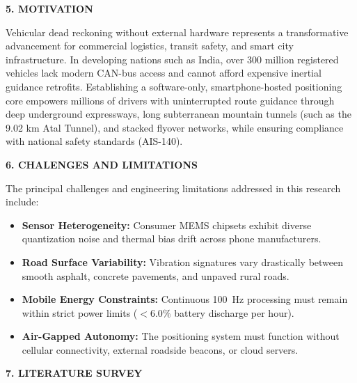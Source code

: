 \documentclass[11pt,a4paper]{article}
\begin{document}
\vspace{0.15cm}
\begin{center}
{\large \textbf{5. MOTIVATION}}
\end{center}
Vehicular dead reckoning without external hardware represents a transformative advancement for commercial logistics, transit safety, and smart city infrastructure. In developing nations such as India, over 300 million registered vehicles lack modern CAN-bus access and cannot afford expensive inertial guidance retrofits. Establishing a software-only, smartphone-hosted positioning core empowers millions of drivers with uninterrupted route guidance through deep underground expressways, long subterranean mountain tunnels (such as the 9.02 km Atal Tunnel), and stacked flyover networks, while ensuring compliance with national safety standards (AIS-140).

\vspace{0.15cm}
\begin{center}
{\large \textbf{6. CHALENGES AND LIMITATIONS}}
\end{center}
The principal challenges and engineering limitations addressed in this research include:
\begin{itemize}[leftmargin=0.7cm,itemsep=1.0pt]
\item \textbf{Sensor Heterogeneity:} Consumer MEMS chipsets exhibit diverse quantization noise and thermal bias drift across phone manufacturers.
\item \textbf{Road Surface Variability:} Vibration signatures vary drastically between smooth asphalt, concrete pavements, and unpaved rural roads.
\item \textbf{Mobile Energy Constraints:} Continuous 100~Hz processing must remain within strict power limits ($<6.0\%$ battery discharge per hour).
\item \textbf{Air-Gapped Autonomy:} The positioning system must function without cellular connectivity, external roadside beacons, or cloud servers.
\end{itemize}
\newpage

\begin{center}
{\large \textbf{7. LITERATURE SURVEY}}
\end{center}
\end{document}
